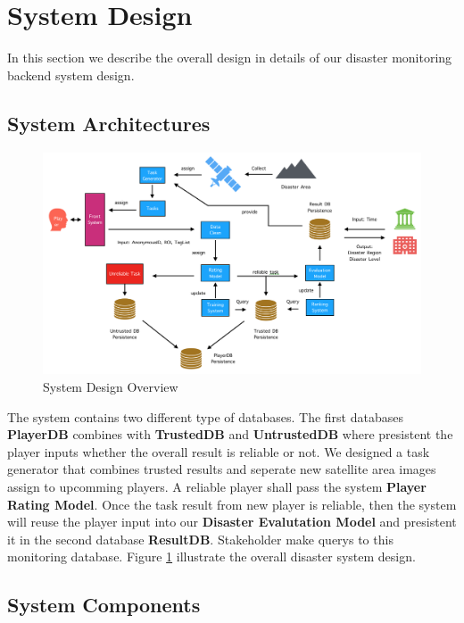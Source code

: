 \section{System Design}

In this section we describe the overall design in details of our disaster monitoring backend system design.

\subsection{System Architectures}

  \begin{figure}[htp]
  \centering
  \includegraphics[width=\textwidth]{figures/system2}
  \caption{System Design Overview}
  \label{fig:arch}
  \end{figure}

  The system contains two different type of databases. The first databases \textbf{PlayerDB}
  combines with \textbf{TrustedDB} and \textbf{UntrustedDB} where
  presistent the player inputs whether the overall result is reliable or not. 
  We designed a task generator that combines 
  trusted results and seperate new satellite area images assign to upcomming players. 
  A reliable player shall pass the system \textbf{Player Rating Model}. 
  Once the task result from new player is reliable, then the system will
  reuse the player input into our \textbf{Disaster Evalutation Model} and presistent it in the second
  database \textbf{ResultDB}. Stakeholder make querys to this monitoring database. 
  Figure \ref{fig:arch} illustrate the overall disaster system design.

  

\subsection{System Components}

